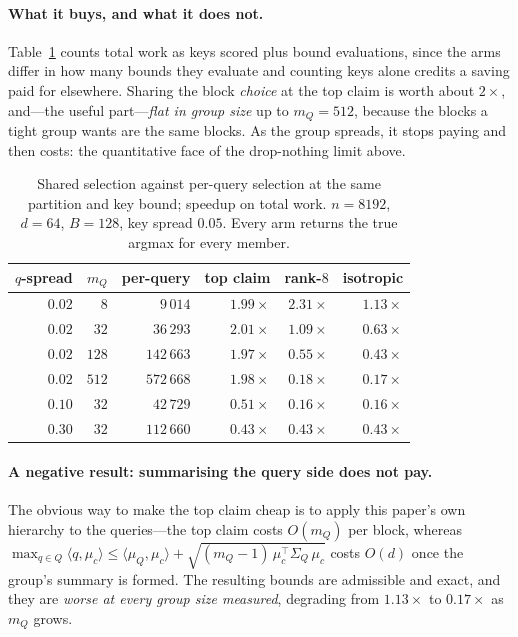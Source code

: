 \documentclass[11pt]{article}
\numberwithin{equation}{section}
\newcommand{\inner}[2]{\langle #1, #2\rangle}
\begin{document}
\paragraph{What it buys, and what it does not.} Table~\ref{tab:group} counts total work as keys scored plus
bound evaluations, since the arms differ in how many bounds they evaluate and counting keys alone credits a
saving paid for elsewhere. Sharing the block \emph{choice} at the top claim is worth about $2\times$, and---the
useful part---\emph{flat in group size} up to $m_Q=512$, because the blocks a tight group wants are the same
blocks. As the group spreads, it stops paying and then costs: the quantitative face of the
drop-nothing limit above.

\begin{table}[h]
\centering
\begin{tabular}{rrrrrr}
\toprule
$q$-spread & $m_Q$ & per-query & top claim & rank-$8$ & isotropic\\
\midrule
$0.02$ & $8$   & $9\,014$   & $1.99\times$ & $2.31\times$ & $1.13\times$\\
$0.02$ & $32$  & $36\,293$  & $2.01\times$ & $1.09\times$ & $0.63\times$\\
$0.02$ & $128$ & $142\,663$ & $1.97\times$ & $0.55\times$ & $0.43\times$\\
$0.02$ & $512$ & $572\,668$ & $1.98\times$ & $0.18\times$ & $0.17\times$\\
$0.10$ & $32$  & $42\,729$  & $0.51\times$ & $0.16\times$ & $0.16\times$\\
$0.30$ & $32$  & $112\,660$ & $0.43\times$ & $0.43\times$ & $0.43\times$\\
\bottomrule
\end{tabular}
\caption{Shared selection against per-query selection at the same partition and key bound; speedup on total
work. $n=8192$, $d=64$, $B=128$, key spread $0.05$. Every arm returns the true argmax for every member.}
\label{tab:group}
\end{table}

\paragraph{A negative result: summarising the query side does not pay.} The obvious way to make the top claim
cheap is to apply this paper's own hierarchy to the queries---the top claim costs $O(m_Q)$ per block, whereas
$\max_{q\in Q}\inner{q}{\mu_c}\le\inner{\mu_Q}{\mu_c}+\sqrt{(m_Q-1)\,\mu_c^\top\Sigma_Q\,\mu_c}$ costs
$O(d)$ once the group's summary is formed. The resulting bounds are admissible and exact, and they are
\emph{worse at every group size measured}, degrading from $1.13\times$ to $0.17\times$ as $m_Q$ grows.
\end{document}

